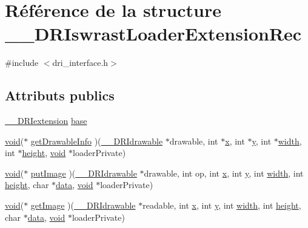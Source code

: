 \hypertarget{struct_____d_r_iswrast_loader_extension_rec}{\section{Référence de la structure \-\_\-\-\_\-\-D\-R\-Iswrast\-Loader\-Extension\-Rec}
\label{struct_____d_r_iswrast_loader_extension_rec}
}


{\ttfamily \#include $<$dri\-\_\-interface.\-h$>$}

\subsection*{Attributs publics}
\begin{DoxyCompactItemize}
\item 
\hyperlink{dri__interface_8h_a4e0a61c8ece00d2b2c6792a9a1b55385}{\-\_\-\-\_\-\-D\-R\-Iextension} \hyperlink{struct_____d_r_iswrast_loader_extension_rec_a96cf72333713114d44048417ae72c9a5}{base}
\item 
\hyperlink{glu_8h_a4292190e3f1f6b373a760c7d9316ad3c}{void}($\ast$ \hyperlink{struct_____d_r_iswrast_loader_extension_rec_aab569a9dfd8d660e8bac16c94c123b86}{get\-Drawable\-Info} )(\hyperlink{dri__interface_8h_a5bfb832a0a08208d95b3bbef439d2262}{\-\_\-\-\_\-\-D\-R\-Idrawable} $\ast$drawable, int $\ast$\hyperlink{gl_8h_a0cdec8e97a75ee9458b23d152bf962d4}{x}, int $\ast$\hyperlink{gl_8h_a74d80fd479c0f6d0153c709949a089ef}{y}, int $\ast$\hyperlink{gl_8h_a30a197eaed803ac3cd1b444d4c972354}{width}, int $\ast$\hyperlink{gl_8h_aab021b2df174b06135ca6744356dcf34}{height}, \hyperlink{glu_8h_a4292190e3f1f6b373a760c7d9316ad3c}{void} $\ast$loader\-Private)
\item 
\hyperlink{glu_8h_a4292190e3f1f6b373a760c7d9316ad3c}{void}($\ast$ \hyperlink{struct_____d_r_iswrast_loader_extension_rec_a4e7a71f670fe54938191a8b871754bde}{put\-Image} )(\hyperlink{dri__interface_8h_a5bfb832a0a08208d95b3bbef439d2262}{\-\_\-\-\_\-\-D\-R\-Idrawable} $\ast$drawable, int op, int \hyperlink{gl_8h_a0cdec8e97a75ee9458b23d152bf962d4}{x}, int \hyperlink{gl_8h_a74d80fd479c0f6d0153c709949a089ef}{y}, int \hyperlink{gl_8h_a30a197eaed803ac3cd1b444d4c972354}{width}, int \hyperlink{gl_8h_aab021b2df174b06135ca6744356dcf34}{height}, char $\ast$\hyperlink{gl_8h_ae71d2e007af6a1d1ed622d3e8be266e2}{data}, \hyperlink{glu_8h_a4292190e3f1f6b373a760c7d9316ad3c}{void} $\ast$loader\-Private)
\item 
\hyperlink{glu_8h_a4292190e3f1f6b373a760c7d9316ad3c}{void}($\ast$ \hyperlink{struct_____d_r_iswrast_loader_extension_rec_a0ea3e830001252e2384246efab900556}{get\-Image} )(\hyperlink{dri__interface_8h_a5bfb832a0a08208d95b3bbef439d2262}{\-\_\-\-\_\-\-D\-R\-Idrawable} $\ast$readable, int \hyperlink{gl_8h_a0cdec8e97a75ee9458b23d152bf962d4}{x}, int \hyperlink{gl_8h_a74d80fd479c0f6d0153c709949a089ef}{y}, int \hyperlink{gl_8h_a30a197eaed803ac3cd1b444d4c972354}{width}, int \hyperlink{gl_8h_aab021b2df174b06135ca6744356dcf34}{height}, char $\ast$\hyperlink{gl_8h_ae71d2e007af6a1d1ed622d3e8be266e2}{data}, \hyperlink{glu_8h_a4292190e3f1f6b373a760c7d9316ad3c}{void} $\ast$loader\-Private)
\end{DoxyCompactItemize}


